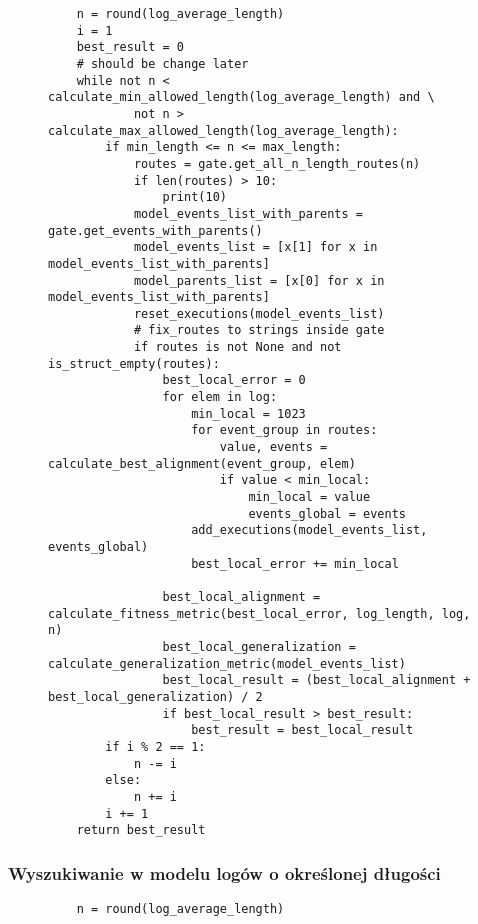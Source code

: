 \begin{figure}[!ht]
\lstset{caption=Parser gramatyki, captionpos=b}
\lstset{label=src:passive, frame=single}
\begin{lstlisting}
    n = round(log_average_length)
    i = 1
    best_result = 0
    # should be change later
    while not n < calculate_min_allowed_length(log_average_length) and \
            not n > calculate_max_allowed_length(log_average_length):
        if min_length <= n <= max_length:
            routes = gate.get_all_n_length_routes(n)
            if len(routes) > 10:
                print(10)
            model_events_list_with_parents = gate.get_events_with_parents()
            model_events_list = [x[1] for x in model_events_list_with_parents]
            model_parents_list = [x[0] for x in model_events_list_with_parents]
            reset_executions(model_events_list)
            # fix_routes to strings inside gate
            if routes is not None and not is_struct_empty(routes):
                best_local_error = 0
                for elem in log:
                    min_local = 1023
                    for event_group in routes:
                        value, events = calculate_best_alignment(event_group, elem)
                        if value < min_local:
                            min_local = value
                            events_global = events
                    add_executions(model_events_list, events_global)
                    best_local_error += min_local

                best_local_alignment = calculate_fitness_metric(best_local_error, log_length, log, n)
                best_local_generalization = calculate_generalization_metric(model_events_list)
                best_local_result = (best_local_alignment + best_local_generalization) / 2
                if best_local_result > best_result:
                    best_result = best_local_result
        if i % 2 == 1:
            n -= i
        else:
            n += i
        i += 1
    return best_result
\end{lstlisting}
\end{figure}

\subsubsection{Wyszukiwanie w modelu logów o określonej długości}

\begin{figure}[!ht]
\lstset{caption=Parser gramatyki, captionpos=b}
\lstset{label=src:passive, frame=single}
\begin{lstlisting}
    n = round(log_average_length)
\end{lstlisting}
\end{figure}

